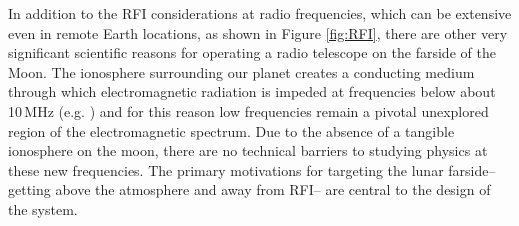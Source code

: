 In addition to the RFI considerations at radio frequencies, which can be extensive even in remote Earth locations, as shown in Figure \ref{fig:RFI}, there are other very significant scientific reasons for operating a radio telescope on the farside of the Moon. The ionosphere surrounding our planet creates a conducting medium through which electromagnetic radiation is impeded at frequencies below about 10\,MHz (e.g. \citealt{Zawdie_2017RS006256}) and for this reason low frequencies remain a pivotal unexplored region of the electromagnetic spectrum.  Due to the absence of a tangible ionosphere on the moon, there are no technical barriers to studying physics at these new frequencies. The primary motivations for targeting the lunar farside-- getting above the atmosphere and away from RFI-- are central to the design of the system. 


